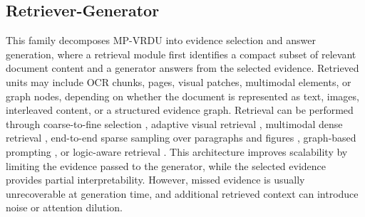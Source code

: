 \documentclass[11pt]{article}
\begin{document}

\subsection{Retriever-Generator}
This family decomposes MP-VRDU into evidence selection and answer generation, where a retrieval module first identifies a compact subset of relevant document content and a generator answers from the selected evidence. Retrieved units may include OCR chunks, pages, visual patches, multimodal elements, or graph nodes, depending on whether the document is represented as text, images, interleaved content, or a structured evidence graph. Retrieval can be performed through coarse-to-fine selection \cite{zhang2024cream}, adaptive visual retrieval \cite{li2025avir}, multimodal dense retrieval \cite{cho2024m3docrag, tanaka2025vdocrag}, end-to-end sparse sampling over paragraphs and figures \cite{xie2024wukong}, graph-based prompting \cite{wang2024knowledge}, or logic-aware retrieval \cite{wu2025molorag}. This architecture improves scalability by limiting the evidence passed to the generator, while the selected evidence provides partial interpretability. However, missed evidence is usually unrecoverable at generation time, and additional retrieved context can introduce noise or attention dilution.
\end{document}
